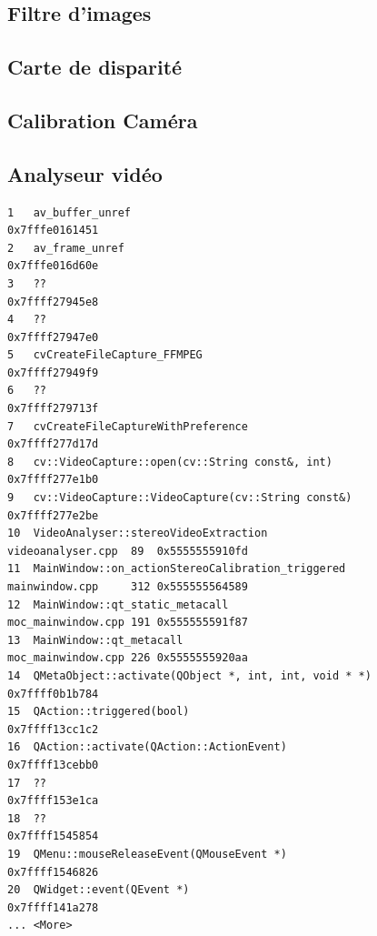 \documentclass{article}
\begin{document}
\subsection{Filtre d'images}


\newpage
\subsection{Carte de disparité}


\newpage
\subsection{Calibration Caméra}


\newpage
\subsection{Analyseur vidéo}

\begin{lstlisting}[style=NoStyle, caption ={Debug trace VideoCapture SEGFAULT}]
1   av_buffer_unref                                                             0x7fffe0161451 
2   av_frame_unref                                                              0x7fffe016d60e 
3   ??                                                                          0x7ffff27945e8 
4   ??                                                                          0x7ffff27947e0 
5   cvCreateFileCapture_FFMPEG                                                  0x7ffff27949f9 
6   ??                                                                          0x7ffff279713f 
7   cvCreateFileCaptureWithPreference                                           0x7ffff277d17d 
8   cv::VideoCapture::open(cv::String const&, int)                              0x7ffff277e1b0 
9   cv::VideoCapture::VideoCapture(cv::String const&)                           0x7ffff277e2be 
10  VideoAnalyser::stereoVideoExtraction                 videoanalyser.cpp  89  0x5555555910fd 
11  MainWindow::on_actionStereoCalibration_triggered     mainwindow.cpp     312 0x555555564589 
12  MainWindow::qt_static_metacall                       moc_mainwindow.cpp 191 0x555555591f87 
13  MainWindow::qt_metacall                              moc_mainwindow.cpp 226 0x5555555920aa 
14  QMetaObject::activate(QObject *, int, int, void * *)                        0x7ffff0b1b784 
15  QAction::triggered(bool)                                                    0x7ffff13cc1c2 
16  QAction::activate(QAction::ActionEvent)                                     0x7ffff13cebb0 
17  ??                                                                          0x7ffff153e1ca 
18  ??                                                                          0x7ffff1545854 
19  QMenu::mouseReleaseEvent(QMouseEvent *)                                     0x7ffff1546826 
20  QWidget::event(QEvent *)                                                    0x7ffff141a278 
... <More>                                                                                     
\end{lstlisting}
\end{document}
